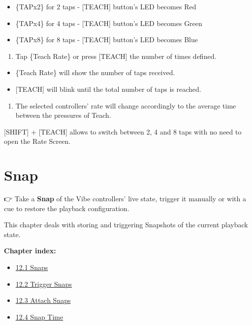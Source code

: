 \documentclass[
]{article}
\providecommand{\tightlist}{%
  \setlength{\itemsep}{0pt}\setlength{\parskip}{0pt}}
\begin{document}
\begin{itemize}
\item
  \{TAPx2\} for 2 taps - {[}TEACH{]} button's LED becomes Red
\item
  \{TAPx4\} for 4 taps - {[}TEACH{]} button's LED becomes Green
\item
  \{TAPx8\} for 8 taps - {[}TEACH{]} button's LED becomes Blue
\end{itemize}

\begin{enumerate}
\def\labelenumi{\arabic{enumi}.}
\setcounter{enumi}{1}
\tightlist
\item
  Tap \{Teach Rate\} or press {[}TEACH{]} the number of times defined.
\end{enumerate}

\begin{itemize}
\item
  \{Teach Rate\} will show the number of taps received.
\item
  {[}TEACH{]} will blink until the total number of taps is reached.
\end{itemize}

\begin{enumerate}
\def\labelenumi{\arabic{enumi}.}
\setcounter{enumi}{2}
\tightlist
\item
  The selected controllers' rate will change accordingly to the average time between the pressures of Teach.
\end{enumerate}

{[}SHIFT{]} + {[}TEACH{]} allows to switch between 2, 4 and 8 taps with no need to open the Rate Screen.

\hypertarget{snap}{%
\section{Snap}\label{snap}}

👉 Take a \textbf{Snap} of the Vibe controllers' live state, trigger it manually or with a cue to restore the playback configuration.

This chapter deals with storing and triggering Snapshots of the current playback state.

\textbf{Chapter index:}

\begin{itemize}
\tightlist
\item
  \protect\hyperlink{Snaps-12.1}{12.1 Snaps}
\item
  \protect\hyperlink{Trigger-Snaps-12.2}{12.2 Trigger Snaps}
\item
  \protect\hyperlink{Attach-Snaps-12.3}{12.3 Attach Snaps}
\item
  \protect\hyperlink{Snap-Time-12.4}{12.4 Snap Time}
\end{itemize}
\end{document}
